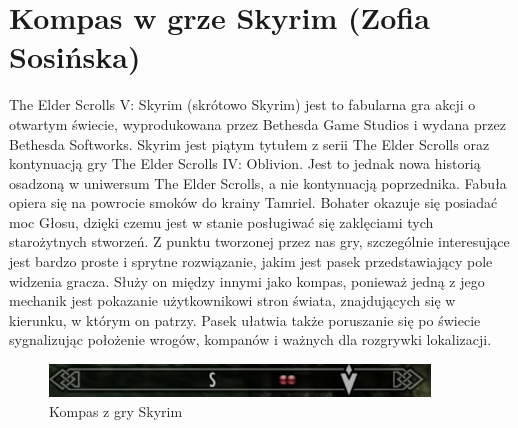 \section{Kompas w grze Skyrim (Zofia Sosińska)}\label{chap:skrm}

The Elder Scrolls V: Skyrim (skrótowo Skyrim) jest to fabularna gra akcji o otwartym świecie, wyprodukowana przez Bethesda Game Studios i wydana przez Bethesda Softworks. Skyrim jest piątym tytułem z serii The Elder Scrolls oraz kontynuacją gry The Elder Scrolls IV: Oblivion. Jest to jednak nowa historią osadzoną w uniwersum The Elder Scrolls, a nie kontynuacją poprzednika. Fabuła opiera się na powrocie smoków do krainy Tamriel. Bohater okazuje się posiadać moc Głosu, dzięki czemu jest w stanie posługiwać się zaklęciami tych starożytnych stworzeń.
	Z punktu tworzonej przez nas gry, szczególnie interesujące jest  bardzo proste i sprytne rozwiązanie, jakim jest pasek przedstawiający pole widzenia gracza. Służy on między innymi jako kompas, ponieważ jedną z jego mechanik jest pokazanie użytkownikowi stron świata, znajdujących się w kierunku, w którym on patrzy. Pasek ułatwia także poruszanie się po świecie sygnalizując położenie wrogów, kompanów i ważnych dla rozgrywki lokalizacji.


	\begin{figure}[htbp]
		\centering
		\includegraphics[width=0.9\textwidth]{images/ui/compassSkyrim.png}
		\caption{Kompas z gry Skyrim}\label{fig:Fallout}
	\end{figure}


